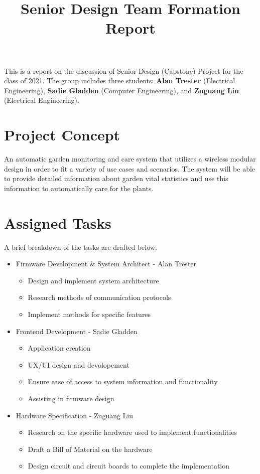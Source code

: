 \documentclass[]{article}
\title{Senior Design Team Formation Report}
\begin{document}
\maketitle

This is a report on the discussion of Senior Design (Capstone) Project for the class of 2021. The group includes three students: \textbf{Alan Trester} (Electrical Engineering), \textbf{Sadie Gladden} (Computer Engineering), and \textbf{Zuguang Liu} (Electrical Engineering).


\section{Project Concept}
	An automatic garden monitoring and care system that utilizes a wireless modular design in order to fit a variety of use cases and scenarios. The system will be able to provide detailed information about garden vital statistics and use this information to automatically care for the plants.
	
\section{Assigned Tasks}
	A brief breakdown of the tasks are drafted below.
\begin{itemize}
	\item Firmware Development \& System Architect - Alan Trester
	\begin{itemize}
		\item Design and implement system architecture 
		\item Research methods of communication protocols 
		\item Implement methods for specific features
	\end{itemize}

	\item Frontend Development - Sadie Gladden
	\begin{itemize}
		\item Application creation
		\item UX/UI design and devolopement 
		\item Ensure ease of access to system information and functionality
		\item Assisting in firmware design
	\end{itemize}

	\item Hardware Specification - Zuguang Liu
	\begin{itemize}
		\item Research on the specific hardware used to implement functionalities
		\item Draft a Bill of Material on the hardware
		\item Design circuit and circuit boards to complete the implementation
	\end{itemize}
\end{itemize}
\end{document}
